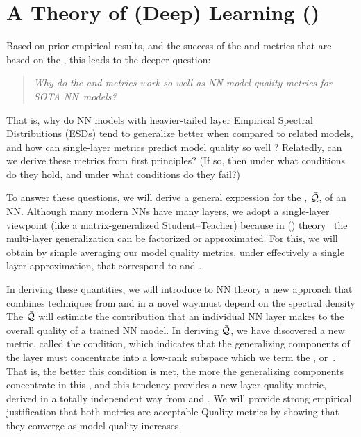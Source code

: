 \section{A \SemiEmpirical Theory of (Deep) Learning (\SETOL)}
\label{sxn:setol}
Based on prior empirical results, and the success of the \ALPHA and \ALPHAHAT metrics that are based on the \HTSR \Phenomenology, this leads to the deeper question: 
%
\begin{quote}
\emph{Why do the \ALPHA and \ALPHAHAT metrics work so well as NN model quality metrics for SOTA NN~models?}
\end{quote}
That is, why do NN models with heavier-tailed layer Empirical Spectral Distributions  (ESDs) tend to generalize better when compared to related models, and how can single-layer metrics predict model quality so well ?
Relatedly, can we derive these metrics from first principles?
(If so, then under what conditions do they hold, and under what conditions do they fail?)

\noindent
To answer these questions, we will derive a general expression for the \LayerQuality, $\bar{\mathcal{Q}}$, of an NN.
Although many modern NNs have many layers, we adopt a single-layer viewpoint (like a matrix-generalized Student–Teacher) because in \StatisticalMechanicsOfGeneralization (\SMOG) theory~\cite{SST92,STS90} the multi-layer generalization can be factorized or approximated.
For this, we will obtain by simple averaging our model quality metrics, under effectively a single layer approximation, that correspond to \ALPHA and \ALPHAHAT.


In deriving these quantities, we will introduce to NN theory a new \SemiEmpirical approach that combines techniques from \STATMECH and \RMT in a novel way.must depend on the spectral density
The \LayerQuality $\bar{\mathcal{Q}}$ will estimate the contribution that an individual NN layer makes to the overall quality of a trained NN model.
In deriving $\bar{\mathcal{Q}}$, we have discovered a new \LayerQuality metric, called the \TRACELOG condition,
which indicates that the generalizing components of the layer must concentrate into a low-rank subspace which we term the \emph{\EffectiveCorrelationSpace}, or~\ECS. That is, the better this condition is met, the more the generalizing components concentrate in this \ECS, and this tendency provides a new layer quality metric, derived in a totally independent way from \ALPHA and \ALPHAHAT. We will provide strong empirical justification that both metrics are acceptable Quality metrics by showing that they converge as model quality increases.

